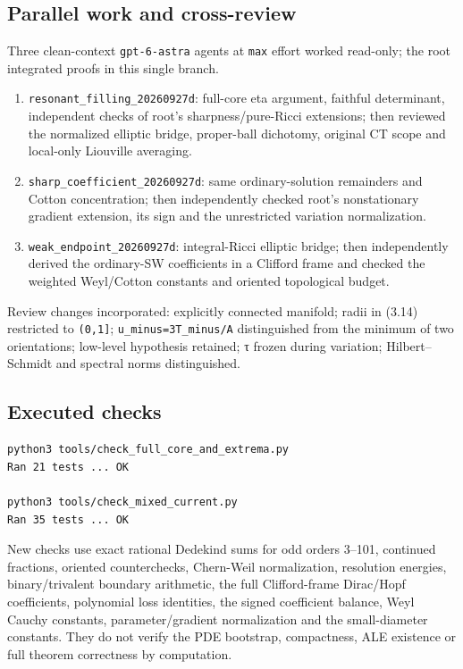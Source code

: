 \documentclass[
  10pt,
]{article}
\providecommand{\tightlist}{%
  \setlength{\itemsep}{0pt}\setlength{\parskip}{0pt}}
\begin{document}
\hypertarget{parallel-work-and-cross-review}{%
\subsection{Parallel work and
cross-review}\label{parallel-work-and-cross-review}}

Three clean-context \texttt{gpt-6-astra} agents at \texttt{max} effort
worked read-only; the root integrated proofs in this single branch.

\begin{enumerate}
\def\labelenumi{\arabic{enumi}.}
\tightlist
\item
  \nolinkurl{resonant_filling_20260927d}: full-core eta argument,
  faithful determinant, independent checks of root's
  sharpness/pure-Ricci extensions; then reviewed the normalized elliptic
  bridge, proper-ball dichotomy, original CT scope and local-only
  Liouville averaging.
\item
  \nolinkurl{sharp_coefficient_20260927d}: same ordinary-solution
  remainders and Cotton concentration; then independently checked root's
  nonstationary gradient extension, its sign and the unrestricted
  variation normalization.
\item
  \nolinkurl{weak_endpoint_20260927d}: integral-Ricci elliptic bridge;
  then independently derived the ordinary-SW coefficients in a Clifford
  frame and checked the weighted Weyl/Cotton constants and oriented
  topological budget.
\end{enumerate}

Review changes incorporated: explicitly connected manifold; radii in
(3.14) restricted to \texttt{(0,1{]}}; \texttt{u\_minus=3T\_minus/A}
distinguished from the minimum of two orientations; low-level hypothesis
retained; τ frozen during variation; Hilbert--Schmidt and spectral norms
distinguished.

\hypertarget{executed-checks}{%
\subsection{Executed checks}\label{executed-checks}}

\begin{verbatim}
python3 tools/check_full_core_and_extrema.py
Ran 21 tests ... OK

python3 tools/check_mixed_current.py
Ran 35 tests ... OK
\end{verbatim}

New checks use exact rational Dedekind sums for odd orders 3--101,
continued fractions, oriented counterchecks, Chern-Weil normalization,
resolution energies, binary/trivalent boundary arithmetic, the full
Clifford-frame Dirac/Hopf coefficients, polynomial loss identities, the
signed coefficient balance, Weyl Cauchy constants, parameter/gradient
normalization and the small-diameter constants. They do not verify the
PDE bootstrap, compactness, ALE existence or full theorem correctness by
computation.
\end{document}
